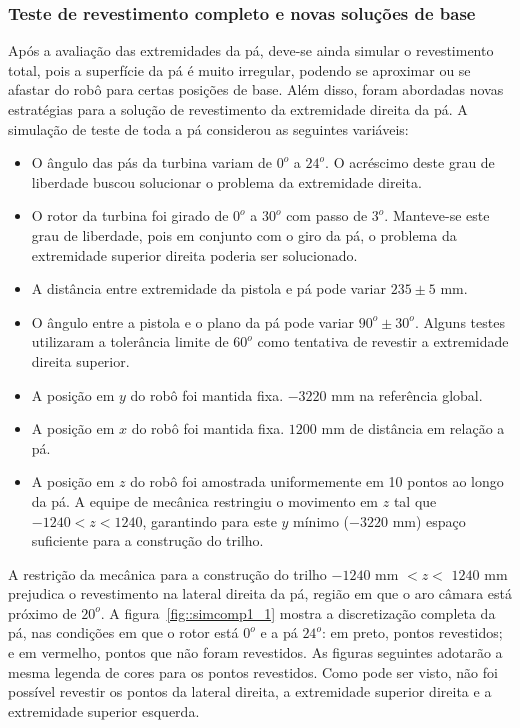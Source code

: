\subsubsection{Teste de revestimento completo e novas soluções de base}

Após a avaliação das extremidades da pá, deve-se ainda simular o revestimento
total, pois a superfície da pá é muito irregular, podendo se aproximar ou se
afastar do robô para certas posições de base. Além disso, foram abordadas novas
estratégias para a solução de revestimento da extremidade direita da pá. A
simulação de teste de toda a pá considerou as seguintes variáveis:

\begin{itemize}
  \item O ângulo das pás da turbina variam de $0^o$ a $24^o$. O acréscimo deste
  grau de liberdade buscou solucionar o problema da extremidade direita.
  \item O rotor da turbina foi girado de $0^o$ a $30^o$ com passo de $3^o$.
  Manteve-se este grau de liberdade, pois em conjunto com o giro da pá, o
  problema da extremidade superior direita poderia ser solucionado.
  \item A distância entre extremidade da pistola e pá pode variar $235
  \pm 5$ mm.
  \item O ângulo entre a pistola e o plano da pá pode variar $90^o \pm
  30^o$. Alguns testes utilizaram a tolerância limite de $60^o$ como tentativa
  de revestir a extremidade direita superior.
  \item A posição em $y$ do robô foi mantida fixa. $-3220$ mm na referência
  global.
  \item A posição em $x$ do robô foi mantida fixa. $1200$ mm de
  distância em relação a pá.
  \item A posição em $z$ do robô foi amostrada uniformemente em 10 pontos ao
  longo da pá. A equipe de mecânica restringiu o movimento em $z$ tal que
  $-1240 < z < 1240$, garantindo para este $y$ mínimo ($-3220$ mm) espaço
  suficiente para a construção do trilho.
\end{itemize}

A restrição da mecânica para a construção do trilho $-1240$ mm $< z <$ $1240$ mm
prejudica o revestimento na lateral direita da pá, região em que o aro câmara
está próximo de $20^o$. A figura~\ref{fig::simcomp1_1} mostra a
discretização completa da pá, nas condições em que o rotor está $0^o$ e a pá
$24^o$:
em preto, pontos revestidos; e em vermelho, pontos que não foram revestidos. As
figuras seguintes adotarão a mesma legenda de cores para os pontos revestidos.
Como pode ser visto, não foi possível revestir os pontos da lateral direita, a extremidade superior direita e a extremidade superior esquerda.

